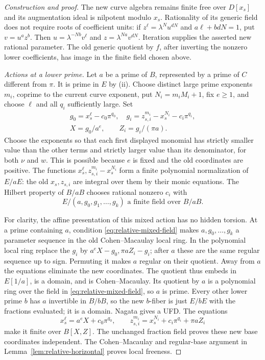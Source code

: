 \documentclass[11pt,reqno]{amsart}
\numberwithin{equation}{section}
\theoremstyle{plain}
\theoremstyle{definition}
\theoremstyle{remark}
\begin{document}
\begin{proof}[Construction and proof]
The new curve algebra remains finite free over \(D[x_s]\) and
its augmentation ideal is nilpotent modulo \(x_s\).  Rationality
of its generic field does not require roots of coefficient units:
if \(z^\ell=\lambda^N u^{dN}\) and
\(a\ell+b dN=1\), put \(v=u^a z^b\).  Then
\(u=\lambda^{-Nb}v^\ell\) and
\(z=\lambda^{Na}v^{dN}\).  Iteration supplies the asserted new
rational parameter.  The old generic quotient by \(f\), after
inverting the nonzero lower coefficients, has image in the finite
field chosen above.

\smallskip\noindent\emph{Actions at a lower prime.}
Let \(a\) be a prime of \(B\), represented by a prime of \(C\)
different from \(\pi\).  It is prime in \(E\) by (ii).
Choose distinct large prime exponents \(m_i\), coprime to the
current curve exponent, put \(N_i=m_iM_i+1\), fix \(e\ge1\),
and choose \(\ell\) and all \(q_i\) sufficiently large.  Set
\begin{equation}\label{eq:relative-mixed}
\begin{gathered}
g_0=x_s^\ell-c_0\pi^{q_0},\quad
 g_i=z_{s,i}^{m_i}-x_s^{N_i}-c_i\pi^{q_i},\\
 X=g_0/a^e,\qquad Z_i=g_i/(\pi a).
\end{gathered}
\end{equation}
Choose the exponents so that each first displayed monomial has
strictly smaller value than the other terms and strictly larger
value than its denominator, for both \(\nu\) and \(w\).
This is possible because \(e\) is fixed and the old coordinates
are positive.  The functions
\(x_s^\ell,z_{s,i}^{m_i}-x_s^{N_i}\) form a finite polynomial
normalization of \(E/aE\): the old \(x_s,z_{s,i}\) are integral
over them by their monic equations.  The Hilbert property of
\(B/aB\) chooses rational nonzero \(c_i\) with
\begin{equation}\label{eq:relative-mixed-field}
E/(a,g_0,g_1,\ldots,g_k)\text{ a finite field over }B/aB.
\end{equation}

For clarity, the affine presentation of this mixed action has no
hidden torsion.  At a prime containing \(a\), condition
\eqref{eq:relative-mixed-field} makes
\(a,g_0,\ldots,g_k\) a parameter sequence in the old
Cohen--Macaulay local ring.  In the polynomial local ring replace
the \(g_i\) by \(a^eX-g_0,\pi aZ_i-g_i\); after \(a\)
these are the same regular sequence up to sign.  Permuting it
makes \(a\) regular on their quotient.  Away from \(a\) the
equations eliminate the new coordinates.  The quotient thus
embeds in \(E[1/a]\), is a domain, and is Cohen--Macaulay.  Its
quotient by \(a\) is a polynomial ring over the field in
\eqref{eq:relative-mixed-field}, so \(a\) is prime.  Every other
lower prime \(b\) has \(a\) invertible in \(B/bB\), so the
new \(b\)-fiber is just \(E/bE\) with the fractions evaluated;
it is a domain.  Nagata gives a UFD.  The equations
\[
 x_s^\ell=a^eX+c_0\pi^{q_0},\qquad
 z_{s,i}^{m_i}=x_s^{N_i}+c_i\pi^{q_i}+\pi aZ_i
\]
make it finite over \(B[X,Z]\).  The unchanged fraction field
proves these new base coordinates independent.  The
Cohen--Macaulay and regular-base argument in
Lemma~\ref{lem:relative-horizontal} proves local freeness.


\end{proof}
\end{document}
